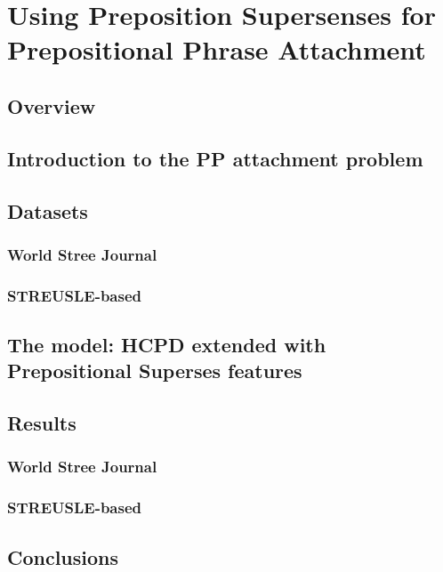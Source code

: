 
\chapter{Using Preposition Supersenses for  Prepositional Phrase Attachment} %

\label{ChapterX} %


\section{Overview}

\section{Introduction to the PP attachment problem}

\section{Datasets}
\subsection{World Stree Journal}
\subsection{STREUSLE-based}

\section{The model: HCPD extended with Prepositional Superses features
}

\section{Results}
\subsection{World Stree Journal}
\subsection{STREUSLE-based}

\section{Conclusions}

